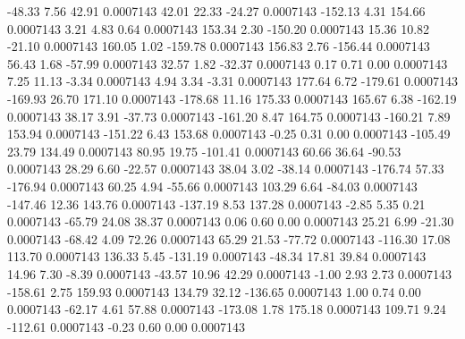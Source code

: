       -48.33        7.56       42.91     0.0007143
       42.01       22.33      -24.27     0.0007143
     -152.13        4.31      154.66     0.0007143
        3.21        4.83        0.64     0.0007143
      153.34        2.30     -150.20     0.0007143
       15.36       10.82      -21.10     0.0007143
      160.05        1.02     -159.78     0.0007143
      156.83        2.76     -156.44     0.0007143
       56.43        1.68      -57.99     0.0007143
       32.57        1.82      -32.37     0.0007143
        0.17        0.71        0.00     0.0007143
        7.25       11.13       -3.34     0.0007143
        4.94        3.34       -3.31     0.0007143
      177.64        6.72     -179.61     0.0007143
     -169.93       26.70      171.10     0.0007143
     -178.68       11.16      175.33     0.0007143
      165.67        6.38     -162.19     0.0007143
       38.17        3.91      -37.73     0.0007143
     -161.20        8.47      164.75     0.0007143
     -160.21        7.89      153.94     0.0007143
     -151.22        6.43      153.68     0.0007143
       -0.25        0.31        0.00     0.0007143
     -105.49       23.79      134.49     0.0007143
       80.95       19.75     -101.41     0.0007143
       60.66       36.64      -90.53     0.0007143
       28.29        6.60      -22.57     0.0007143
       38.04        3.02      -38.14     0.0007143
     -176.74       57.33     -176.94     0.0007143
       60.25        4.94      -55.66     0.0007143
      103.29        6.64      -84.03     0.0007143
     -147.46       12.36      143.76     0.0007143
     -137.19        8.53      137.28     0.0007143
       -2.85        5.35        0.21     0.0007143
      -65.79       24.08       38.37     0.0007143
        0.06        0.60        0.00     0.0007143
       25.21        6.99      -21.30     0.0007143
      -68.42        4.09       72.26     0.0007143
       65.29       21.53      -77.72     0.0007143
     -116.30       17.08      113.70     0.0007143
      136.33        5.45     -131.19     0.0007143
      -48.34       17.81       39.84     0.0007143
       14.96        7.30       -8.39     0.0007143
      -43.57       10.96       42.29     0.0007143
       -1.00        2.93        2.73     0.0007143
     -158.61        2.75      159.93     0.0007143
      134.79       32.12     -136.65     0.0007143
        1.00        0.74        0.00     0.0007143
      -62.17        4.61       57.88     0.0007143
     -173.08        1.78      175.18     0.0007143
      109.71        9.24     -112.61     0.0007143
       -0.23        0.60        0.00     0.0007143
